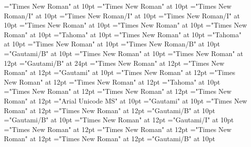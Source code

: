 \documentclass[a4paper]{article}
\begin{document}
\font\spanenspanensensesensesentryletDatadicBody="Times New Roman" at 10pt
\font\spanensensesensesentryletDatadicBody="Times New Roman" at 10pt
\font\spanenspanengrammaticalinfosensesensesentryletDatadicBody="Times New Roman/I" at 10pt
\font\spanengrammaticalinfosensesensesentryletDatadicBody="Times New Roman/I" at 10pt
\font\grammaticalinfosensesensesentryletDatadicBody="Times New Roman/I" at 10pt
\font\sensesensesentryletDatadicBody="Times New Roman" at 10pt
\font\sensesentryletDatadicBody="Times New Roman" at 10pt
\font\spanenpronunciationsentryletDatadicBody="Times New Roman" at 10pt
\font\spanggofonipaxemicpronunciationpronunciationsentryletDatadicBody="Tahoma" at 10pt
\font\spanenpronunciationpronunciationsentryletDatadicBody="Times New Roman" at 10pt
\font\pronunciationpronunciationsentryletDatadicBody="Tahoma" at 10pt
\font\pronunciationsentryletDatadicBody="Times New Roman" at 10pt
\font\spanenheadwordentryletDatadicBody="Times New Roman/B" at 10pt
\font\headwordentryletDatadicBody="Gautami/B" at 10pt
\font\entryletDatadicBody="Times New Roman" at 10pt
\font{}="Times New Roman" at 12pt
\font{}="Gautami/B" at 24pt
\font{}="Times New Roman" at 12pt
\font\xitemtpi="Times New Roman" at 12pt
\font\xitemxitemtranslationLdbefore="Gautami" at 10pt
\font\xitemxitemtranslationbefore="Times New Roman" at 12pt
\font\sensesensesensesbefore="Times New Roman" at 12pt
\font\xitemxitempronunciationsbefore="Times New Roman" at 12pt
\font\xitemxitempronunciationbefore="Tahoma" at 10pt
\font\xitemxitemprimaryrefsbefore="Times New Roman" at 12pt
\font\xitemxitempictureLabelbefore="Times New Roman" at 12pt
\font\xitemxitempartofspeechbefore="Times New Roman" at 12pt
\font\xitemxitemLexSensepublishStemGlossPubLebefore="Arial Unicode MS" at 10pt
\font\xitemxitemLexSensepublishStemGlossPubLdbefore="Gautami" at 10pt
\font\xitemxitemLexEntryTypepublishStemEntryTypeAbbreviationPubbefore="Times New Roman" at 12pt
\font\xitemxitemLexEntryTypepublishStemComplexFormTypeReverseAbbrPubbefore="Times New Roman" at 12pt
\font\xitemxitemLexEntrypublishStemComponentTargetHeadWordRefbefore="Gautami/B" at 10pt
\font\xitemxitemheadwordbefore="Gautami/B" at 10pt
\font\xitemxitemexamplesbefore="Times New Roman" at 12pt
\font\xitemxitemexamplebefore="Gautami/I" at 10pt
\font\xitemxitementryreftypebefore="Times New Roman" at 12pt
\font\xitemxitementryrefcomponentbefore="Times New Roman" at 12pt
\font\xitemxitemdefinitionbefore="Times New Roman" at 12pt
\font\xitemxitemcomplexformrefsbefore="Times New Roman" at 12pt
\font\xitemxitemcomplexformformbefore="Gautami/B" at 10pt
\end{document}
